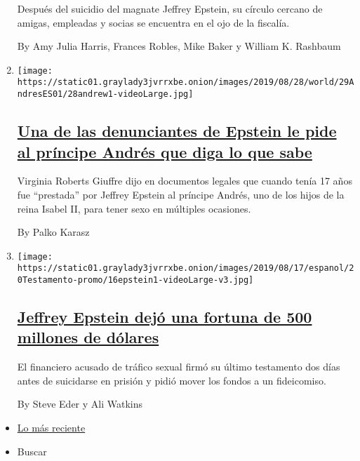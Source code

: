 \begin{enumerate}
  Después del suicidio del magnate Jeffrey Epstein, su círculo cercano
  de amigas, empleadas y socias se encuentra en el ojo de la fiscalía.

  By Amy Julia Harris, Frances Robles, Mike Baker y William K. Rashbaum
\item
  \texttt{[image: https://static01.graylady3jvrrxbe.onion/images/2019/08/28/world/29AndresES01/28andrew1-videoLarge.jpg]}

  \hypertarget{una-de-las-denunciantes-de-epstein-le-pide-al-pruxedncipe-andruxe9s-que-diga-lo-que-sabe}{%
  \subsection{\texorpdfstring{\href{/es/2019/08/28/espanol/mundo/jeffrey-epstein-principe-andres.html}{Una
  de las denunciantes de Epstein le pide al príncipe Andrés que diga lo
  que
  sabe}}{Una de las denunciantes de Epstein le pide al príncipe Andrés que diga lo que sabe}}\label{una-de-las-denunciantes-de-epstein-le-pide-al-pruxedncipe-andruxe9s-que-diga-lo-que-sabe}}

  Virginia Roberts Giuffre dijo en documentos legales que cuando tenía
  17 años fue ``prestada'' por Jeffrey Epstein al príncipe Andrés, uno
  de los hijos de la reina Isabel II, para tener sexo en múltiples
  ocasiones.

  By Palko Karasz
\item
  \texttt{[image: https://static01.graylady3jvrrxbe.onion/images/2019/08/17/espanol/20Testamento-promo/16epstein1-videoLarge-v3.jpg]}

  \hypertarget{jeffrey-epstein-dejuxf3-una-fortuna-de-500-millones-de-duxf3lares}{%
  \subsection{\texorpdfstring{\href{/es/2019/08/20/espanol/mundo/jeffrey-epstein-dinero-testamento.html}{Jeffrey
  Epstein dejó una fortuna de 500 millones de
  dólares}}{Jeffrey Epstein dejó una fortuna de 500 millones de dólares}}\label{jeffrey-epstein-dejuxf3-una-fortuna-de-500-millones-de-duxf3lares}}

  El financiero acusado de tráfico sexual firmó su último testamento dos
  días antes de suicidarse en prisión y pidió mover los fondos a un
  fideicomiso.

  By Steve Eder y Ali Watkins
\end{enumerate}

\begin{itemize}
\tightlist
\item
  \protect\hyperlink{stream-panel}{Lo más reciente}
\item
  Buscar
\end{itemize}

